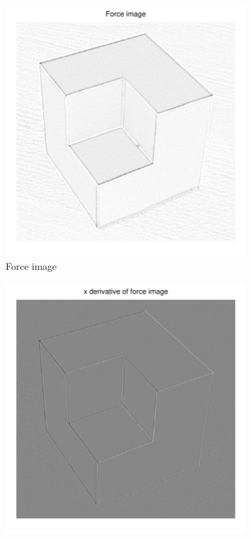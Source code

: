 \documentclass[11pt,a4paper]{article}
\begin{document}
\begin{figure}[H]
\begin{subfigure}[t]{0.21\textwidth}
        \includegraphics[width=\textwidth]{src/images/cubic_log_forces.pdf}
        \caption{Force image}
        \label{fig:cubic_log_forces}
    \end{subfigure}
    \begin{subfigure}[t]{0.21\textwidth}
        \includegraphics[width=\textwidth]{src/images/cubic_log_xforces.pdf}

\end{subfigure}
\end{figure}
\end{document}
